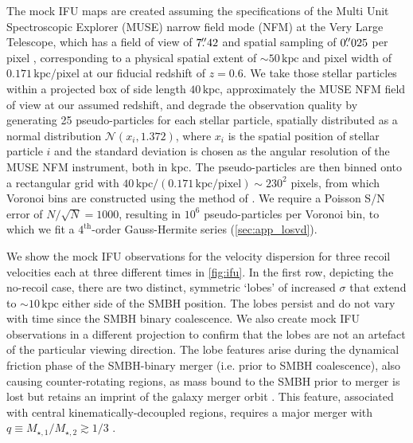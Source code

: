 \documentclass[twocolumn]{aastex631}
\newcommand{\ordinal}[1]{\ensuremath{#1^\mathrm{th}}}         %
\newcommand{\alex}[1]{
{\leavevmode\color[RGB]{224, 77, 24}Alex: #1}
}
\begin{document}
The mock IFU maps are created assuming the specifications of the Multi Unit Spectroscopic Explorer (MUSE) narrow field mode (NFM) at the Very Large Telescope, which has a field of view of $7\mbox{$.\!\!^{\prime\prime}$}42$ and spatial sampling of $0\mbox{$.\!\!^{\prime\prime}$}025$ per pixel \citep[][ see \autoref{tab:instruments}]{bacon2010}, corresponding to a physical spatial extent of $\sim 50\,\mathrm{kpc}$ and pixel width of $0.171\,\mathrm{kpc}/\mathrm{pixel}$ at our fiducial redshift of $z=0.6$.
We take those stellar particles within a projected box of side length $40\,\mathrm{kpc}$, approximately the MUSE NFM field of view at our assumed redshift, and degrade the observation quality by generating 25 pseudo-particles for each stellar particle, spatially distributed as a normal distribution $\mathcal{N}(x_i, 1.372)$, where $x_i$ is the spatial position of stellar particle $i$ and the standard deviation is chosen as the angular resolution of the MUSE NFM instrument, both in kpc.
The pseudo-particles are then binned onto a rectangular grid with $40\,\mathrm{kpc}/(0.171\,\mathrm{kpc}/\mathrm{pixel})\sim230^2$ pixels, from which Voronoi bins are constructed using the method of \citet{cappellari2003}.
We require a Poisson S/N error of $N/\sqrt{N} = 1000$, resulting in $10^6$ pseudo-particles per Voronoi bin, to which we fit a \ordinal{4}-order Gauss-Hermite series (\autoref{sec:app_losvd}).

We show the mock IFU observations for the velocity dispersion for three recoil velocities each at three different times in \autoref{fig:ifu}.
In the first row, depicting the no-recoil case, there are two distinct, symmetric `lobes' of increased $\sigma$ that extend to $\sim 10\,\mathrm{kpc}$ either side of the SMBH position.
The lobes persist and do not vary with time since the SMBH binary coalescence.
We also create mock IFU observations in a different projection to confirm that the lobes are not an artefact of the particular viewing direction.
The lobe features arise during the dynamical friction phase of the SMBH-binary merger (i.e. prior to SMBH coalescence), also causing counter-rotating regions, as mass bound to the SMBH prior to merger is lost but retains an imprint of the galaxy merger orbit \citep{rantala2019,frigo2021}.
This feature, associated with central kinematically-decoupled regions, requires a major merger with $q\equiv M_{\star,1}/M_{\star,2} \gtrsim 1/3$ \citep{rantala2019}.
\end{document}
